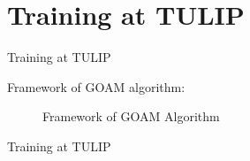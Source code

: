 \documentclass[
 size=14pt,
 paper=smartboard,  %
 mode=present, 		%
 display=slides, 	%
 style=tuliplab,  	%
 pauseslide,
 fleqn,leqno]{powerdot}
\begin{document}
\section{Training at TULIP}


\begin{slide}{Training at TULIP}

Framework of GOAM algorithm:

\bigskip

\begin{figure}
  \centering
  \caption{Framework of GOAM Algorithm} \label{framework}
\end{figure}

\end{slide}


\begin{slide}[toc=,bm=]{Training at TULIP}



\end{slide}
\end{document}
